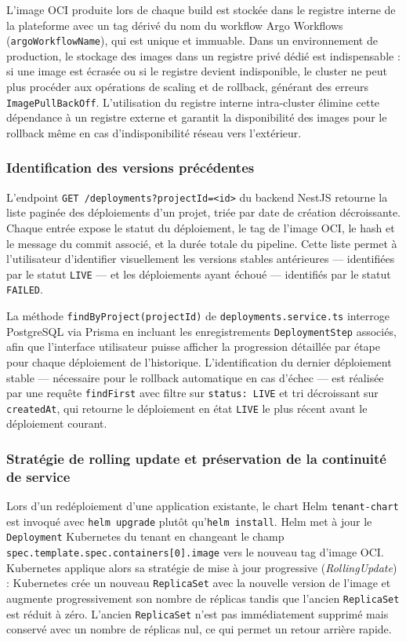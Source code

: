 L'image OCI produite lors de chaque build est stockée dans le registre interne de la plateforme avec un tag dérivé du nom du workflow Argo Workflows (\texttt{argoWorkflowName}), qui est unique et immuable. Dans un environnement de production, le stockage des images dans un registre privé dédié est indispensable : si une image est écrasée ou si le registre devient indisponible, le cluster ne peut plus procéder aux opérations de scaling et de rollback, générant des erreurs \texttt{ImagePullBackOff}.  L'utilisation du registre interne intra-cluster élimine cette dépendance à un registre externe et garantit la disponibilité des images pour le rollback même en cas d'indisponibilité réseau vers l'extérieur.

\subsubsection*{Identification des versions précédentes}

L'endpoint \texttt{GET /deployments?projectId=<id>} du backend NestJS retourne la liste paginée des déploiements d'un projet, triée par date de création décroissante. Chaque entrée expose le statut du déploiement, le tag de l'image OCI, le hash et le message du commit associé, et la durée totale du pipeline. Cette liste permet à l'utilisateur d'identifier visuellement les versions stables antérieures — identifiées par le statut \texttt{LIVE} — et les déploiements ayant échoué — identifiés par le statut \texttt{FAILED}.

La méthode \texttt{findByProject(projectId)} de \texttt{deployments.service.ts} interroge PostgreSQL via Prisma en incluant les enregistrements \texttt{DeploymentStep} associés, afin que l'interface utilisateur puisse afficher la progression détaillée par étape pour chaque déploiement de l'historique. L'identification du dernier déploiement stable — nécessaire pour le rollback automatique en cas d'échec — est réalisée par une requête \texttt{findFirst} avec filtre sur \texttt{status: LIVE} et tri décroissant sur \texttt{createdAt}, qui retourne le déploiement en état \texttt{LIVE} le plus récent avant le déploiement courant.

\subsubsection*{Stratégie de rolling update et préservation de la continuité de service}

Lors d'un redéploiement d'une application existante, le chart Helm \texttt{tenant-chart} est invoqué avec \texttt{helm upgrade} plutôt qu'\texttt{helm install}. Helm met à jour le \texttt{Deployment} Kubernetes du tenant en changeant le champ \texttt{spec.template.spec.containers[0].image} vers le nouveau tag d'image OCI. Kubernetes applique alors sa stratégie de mise à jour progressive (\textit{RollingUpdate}) : Kubernetes crée un nouveau \texttt{ReplicaSet} avec la nouvelle version de l'image et augmente progressivement son nombre de réplicas tandis que l'ancien \texttt{ReplicaSet} est réduit à zéro. L'ancien \texttt{ReplicaSet} n'est pas immédiatement supprimé mais conservé avec un nombre de réplicas nul, ce qui permet un retour arrière rapide. 

